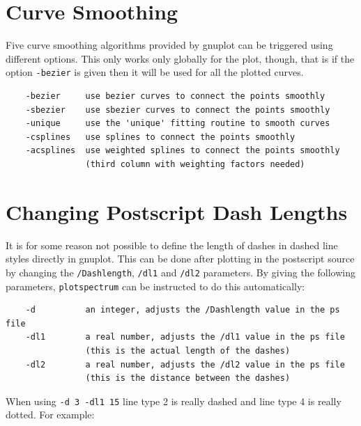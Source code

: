 \documentclass[12pt, a4paper]{article}
\begin{document}


\section{Curve Smoothing}

Five curve smoothing algorithms provided by gnuplot can be triggered using different options. This only works only globally for the plot, though, that is if the option \verb'-bezier' is given then it will be used for all the plotted curves.

\begin{verbatim}
    -bezier     use bezier curves to connect the points smoothly
    -sbezier    use sbezier curves to connect the points smoothly
    -unique     use the 'unique' fitting routine to smooth curves
    -csplines   use splines to connect the points smoothly
    -acsplines  use weighted splines to connect the points smoothly
                (third column with weighting factors needed)
\end{verbatim}




\section{Changing Postscript Dash Lengths}
\label{Sec:DashLengths}

It is for some reason not possible to define the length of dashes in dashed line styles directly in gnuplot. This can be done after plotting in the postscript source by changing the \verb'/Dashlength', \verb'/dl1' and \verb'/dl2' parameters. By giving the following parameters, \verb'plotspectrum' can be instructed to do this automatically:

\begin{verbatim}
    -d          an integer, adjusts the /Dashlength value in the ps file
    -dl1        a real number, adjusts the /dl1 value in the ps file
                (this is the actual length of the dashes)
    -dl2        a real number, adjusts the /dl2 value in the ps file
                (this is the distance between the dashes)
\end{verbatim}

When using \verb'-d 3 -dl1 15' line type 2 is really dashed and line type 4 is really dotted. For example:
\end{document}
